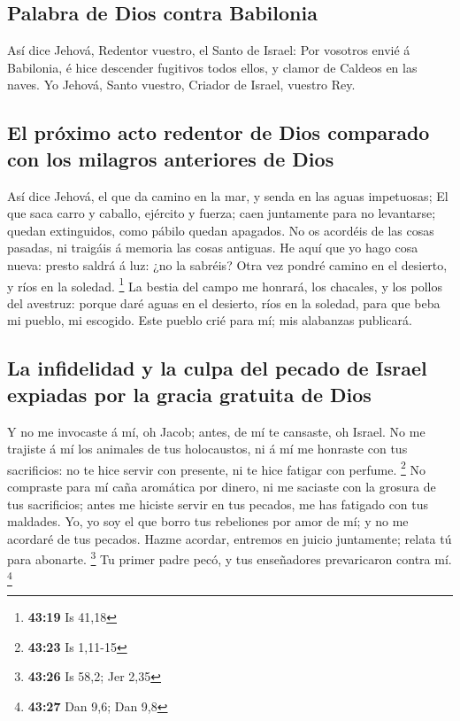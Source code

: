\hypertarget{palabra-de-dios-contra-babilonia}{%
\subsection{Palabra de Dios contra
Babilonia}\label{palabra-de-dios-contra-babilonia}}

 Así dice Jehová, Redentor vuestro, el Santo de Israel: Por
vosotros envié á Babilonia, é hice descender fugitivos todos ellos, y
clamor de Caldeos en las naves.  Yo Jehová, Santo vuestro,
Criador de Israel, vuestro Rey.

\hypertarget{el-pruxf3ximo-acto-redentor-de-dios-comparado-con-los-milagros-anteriores-de-dios}{%
\subsection{El próximo acto redentor de Dios comparado con los milagros
anteriores de
Dios}\label{el-pruxf3ximo-acto-redentor-de-dios-comparado-con-los-milagros-anteriores-de-dios}}

 Así dice Jehová, el que da camino en la mar, y senda en
las aguas impetuosas;  El que saca carro y caballo,
ejército y fuerza; caen juntamente para no levantarse; quedan
extinguidos, como pábilo quedan apagados.  No os acordéis
de las cosas pasadas, ni traigáis á memoria las cosas antiguas.
 He aquí que yo hago cosa nueva: presto saldrá á luz: ¿no
la sabréis? Otra vez pondré camino en el desierto, y ríos en la soledad.
\footnote{\textbf{43:19} Is 41,18}  La bestia del campo me
honrará, los chacales, y los pollos del avestruz: porque daré aguas en
el desierto, ríos en la soledad, para que beba mi pueblo, mi escogido.
 Este pueblo crié para mí; mis alabanzas publicará.

\hypertarget{la-infidelidad-y-la-culpa-del-pecado-de-israel-expiadas-por-la-gracia-gratuita-de-dios}{%
\subsection{La infidelidad y la culpa del pecado de Israel expiadas por
la gracia gratuita de
Dios}\label{la-infidelidad-y-la-culpa-del-pecado-de-israel-expiadas-por-la-gracia-gratuita-de-dios}}

 Y no me invocaste á mí, oh Jacob; antes, de mí te
cansaste, oh Israel.  No me trajiste á mí los animales de
tus holocaustos, ni á mí me honraste con tus sacrificios: no te hice
servir con presente, ni te hice fatigar con perfume. \footnote{\textbf{43:23}
  Is 1,11-15}  No compraste para mí caña aromática por
dinero, ni me saciaste con la grosura de tus sacrificios; antes me
hiciste servir en tus pecados, me has fatigado con tus maldades.
 Yo, yo soy el que borro tus rebeliones por amor de mí; y
no me acordaré de tus pecados.  Hazme acordar, entremos en
juicio juntamente; relata tú para abonarte. \footnote{\textbf{43:26} Is
  58,2; Jer 2,35}  Tu primer padre pecó, y tus enseñadores
prevaricaron contra mí. \footnote{\textbf{43:27} Dan 9,6; Dan 9,8}

